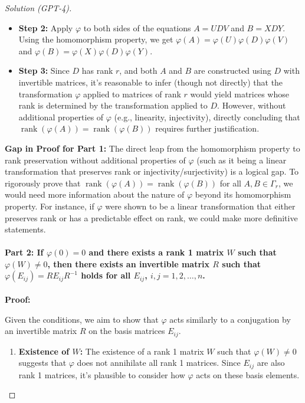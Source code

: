 \documentclass[11pt]{article}
\numberwithin{equation}{section}
\begin{document}
\begin{proof}[Solution (GPT-4)]
\begin{itemize}
  \item \textbf{Step 2:} Apply $\varphi$ to both sides of the equations $A = UDV$ and $B = XDY$. Using the homomorphism property, we get $\varphi(A) = \varphi(U)\varphi(D)\varphi(V)$ and $\varphi(B) = \varphi(X)\varphi(D)\varphi(Y)$.
  
  \item \textbf{Step 3:} Since $D$ has rank $r$, and both $A$ and $B$ are constructed using $D$ with invertible matrices, it's reasonable to infer (though not directly) that the transformation $\varphi$ applied to matrices of rank $r$ would yield matrices whose rank is determined by the transformation applied to $D$. However, without additional properties of $\varphi$ (e.g., linearity, injectivity), directly concluding that $\operatorname{rank}(\varphi(A)) = \operatorname{rank}(\varphi(B))$ requires further justification.
\end{itemize}

\textbf{Gap in Proof for Part 1:} The direct leap from the homomorphism property to rank preservation without additional properties of $\varphi$ (such as it being a linear transformation that preserves rank or injectivity/surjectivity) is a logical gap. To rigorously prove that $\operatorname{rank}(\varphi(A)) = \operatorname{rank}(\varphi(B))$ for all $A, B \in \Gamma_r$, we would need more information about the nature of $\varphi$ beyond its homomorphism property. For instance, if $\varphi$ were shown to be a linear transformation that either preserves rank or has a predictable effect on rank, we could make more definitive statements.

\paragraph{Part 2: If $\varphi(0)=0$ and there exists a rank 1 matrix $W$ such that $\varphi(W)\neq 0$, then there exists an invertible matrix $R$ such that $\varphi(E_{ij})=RE_{ij}R^{-1}$ holds for all $E_{ij}$, $i,j=1,2,\ldots,n$.}

\textbf{Proof:}

Given the conditions, we aim to show that $\varphi$ acts similarly to a conjugation by an invertible matrix $R$ on the basis matrices $E_{ij}$.

\begin{enumerate}
  \item \textbf{Existence of $W$:} The existence of a rank 1 matrix $W$ such that $\varphi(W) \neq 0$ suggests that $\varphi$ does not annihilate all rank 1 matrices. Since $E_{ij}$ are also rank 1 matrices, it's plausible to consider how $\varphi$ acts on these basis elements.
  

\end{enumerate}
\end{proof}
\end{document}
